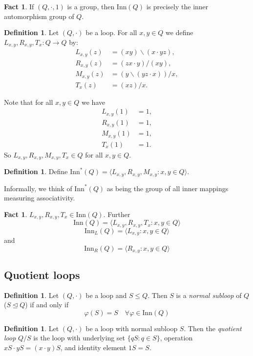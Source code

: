 \documentclass[12pt]{report}
\theoremstyle{definition}
\newtheorem{fct}[thm]{Fact}
\newtheorem{dfn}[thm]{Definition}
\newcommand{\ldv}{\backslash}       %
\newcommand{\rdv}{/}                %
\newcommand{\inn}{\text{Inn}}       %
\begin{document}
\begin{fct}
  If $(Q, \cdot, 1)$ is a group, then $\inn(Q)$ is precisely the inner automorphism group of $Q$.
\end{fct}

\begin{dfn}
  Let $(Q, \cdot)$ be a loop. For all $x, y\in Q$ we define $L_{x, y}, R_{x, y}, T_x: Q\to Q$ by:
  \begin{align*}
    L_{x, y}(z) &= (xy)\ldv(x\cdot yz),\\
    R_{x, y}(z) &= (zx\cdot y)\rdv(xy),\\
    M_{x, y}(z) &= (y\ldv(yz\cdot x))\rdv x,\\
    T_x(z) &= (xz)\rdv x.
  \end{align*}
\end{dfn}

Note that for all $x, y\in Q$ we have
\begin{align*}
  L_{x, y}(1) &= 1,\\
  R_{x, y}(1) &= 1,\\
  M_{x, y}(1) &= 1,\\
  T_x(1) &= 1.
\end{align*}
So $L_{x,y}, R_{x, y}, M_{x, y}, T_x\in Q$ for all $x, y\in Q$.

\begin{dfn}
  Define $\inn^*(Q) = \langle L_{x, y}, R_{x, y}, M_{x, y} : x, y\in Q\rangle$.\
\end{dfn}

Informally, we think of $\inn^*(Q)$ as being the group of all inner mappings measuring associativity.

\begin{fct}
  $L_{x, y}, R_{x, y}, T_x\in \inn(Q)$. Further
  \[\inn(Q) = \langle L_{x, y}, R_{x, y}, T_x : x, y\in Q\rangle\]
  \[\inn_L(Q) = \langle L_{x, y} : x, y\in Q\rangle\] and
  \[\inn_R(Q) = \langle R_{x, y} : x, y\in Q\rangle\]
\end{fct}

\subsection{Quotient loops}

\begin{dfn}
  Let $(Q, \cdot)$ be a loop and $S\leq Q$. Then $S$ is a \emph{normal subloop} of $Q$ ($S\unlhd Q$) if and only if
  \[\varphi(S) = S\quad\forall\varphi\in \inn(Q)\]
\end{dfn}

\begin{dfn}
  Let $(Q, \cdot)$ be a loop with normal subloop $S$. Then the \emph{quotient loop} $Q/S$ is the loop with underlying
    set $\{qS : q\in S\}$, operation $xS\cdot yS = (x\cdot y) S$, and identity element $1S = S$.
\end{dfn}
\end{document}
